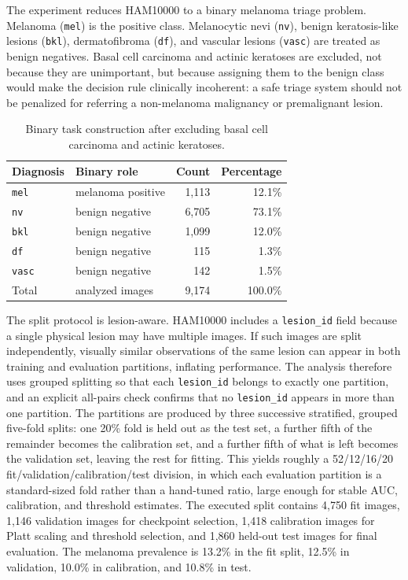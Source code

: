 \documentclass[11pt,a4paper]{article}
\begin{document}
The experiment reduces HAM10000 to a binary melanoma triage problem. Melanoma (\texttt{mel}) is the positive class. Melanocytic nevi (\texttt{nv}), benign keratosis-like lesions (\texttt{bkl}), dermatofibroma (\texttt{df}), and vascular lesions (\texttt{vasc}) are treated as benign negatives. Basal cell carcinoma and actinic keratoses are excluded, not because they are unimportant, but because assigning them to the benign class would make the decision rule clinically incoherent: a safe triage system should not be penalized for referring a non-melanoma malignancy or premalignant lesion.

\begin{table}[htbp]
\centering
\caption{Binary task construction after excluding basal cell carcinoma and actinic keratoses.}
\label{tab:dataset}
\begin{tabular}{llrr}
\toprule
Diagnosis & Binary role & Count & Percentage \\
\midrule
\texttt{mel} & melanoma positive & 1,113 & 12.1\% \\
\texttt{nv} & benign negative & 6,705 & 73.1\% \\
\texttt{bkl} & benign negative & 1,099 & 12.0\% \\
\texttt{df} & benign negative & 115 & 1.3\% \\
\texttt{vasc} & benign negative & 142 & 1.5\% \\
\midrule
Total & analyzed images & 9,174 & 100.0\% \\
\bottomrule
\end{tabular}
\end{table}

The split protocol is lesion-aware. HAM10000 includes a \texttt{lesion\_id} field because a single physical lesion may have multiple images. If such images are split independently, visually similar observations of the same lesion can appear in both training and evaluation partitions, inflating performance. The analysis therefore uses grouped splitting so that each \texttt{lesion\_id} belongs to exactly one partition, and an explicit all-pairs check confirms that no \texttt{lesion\_id} appears in more than one partition. The partitions are produced by three successive stratified, grouped five-fold splits: one 20\% fold is held out as the test set, a further fifth of the remainder becomes the calibration set, and a further fifth of what is left becomes the validation set, leaving the rest for fitting. This yields roughly a 52/12/16/20 fit/validation/calibration/test division, in which each evaluation partition is a standard-sized fold rather than a hand-tuned ratio, large enough for stable AUC, calibration, and threshold estimates. The executed split contains 4,750 fit images, 1,146 validation images for checkpoint selection, 1,418 calibration images for Platt scaling and threshold selection, and 1,860 held-out test images for final evaluation. The melanoma prevalence is 13.2\% in the fit split, 12.5\% in validation, 10.0\% in calibration, and 10.8\% in test.
\end{document}
